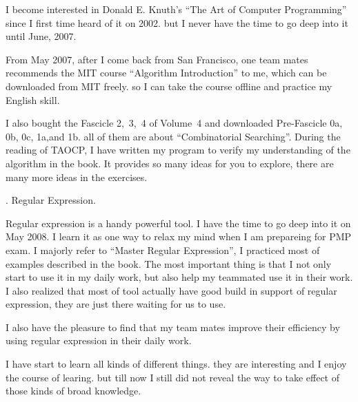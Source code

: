 I become interested in Donald E. Knuth's ``The Art of Computer Programming'' 
since I first time heard of it on 2002. but I never have the time to go deep into
 it until June, 2007.
 
From May 2007, after I come back from San Francisco, one team mates recommends 
the MIT course ``Algorithm Introduction'' to me, which can be downloaded from
MIT freely. so I can take the course offline and practice my English skill. 

I also bought the Fascicle 2,~3,~4 of Volume~4 and downloaded Pre-Fascicle 0a, 
0b, 0c, 1a,and 1b. all of them are about ``Combinatorial Searching''.
During the reading of TAOCP, I have written my program to verify my 
understanding of the algorithm in the book. It provides so many ideas for you 
to explore, there are many more ideas in the exercises. 

{}. Regular Expression.

Regular expression is a handy powerful tool. I have the time to go deep into it
on May 2008. I learn it as one way to relax my mind when I am prepareing for 
PMP exam. I majorly refer to ``Master Regular Expression'', I practiced most 
of examples described in the book. The most important thing is that I not only 
start to use it in my daily work, but also help my teammated use it in their 
work. I also realized that most of tool actually have good build in
support of regular expression, they are just there waiting for us to use.

I also have the pleasure to find that my team mates improve their efficiency by 
 using regular expression in their daily work.

\par

I have start to learn all kinds of different things. they are interesting and I
enjoy the course of learing. but till now I still did not reveal the way to 
take effect of those kinds of broad knowledge.   
 
 \bye
